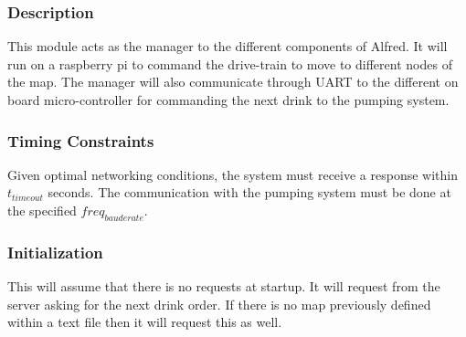 \documentclass [10pt]{article}
\begin{document}

\subsubsection{Description}
This module acts as the manager to the different components of Alfred. It will run on a raspberry pi to command the drive-train to move to different nodes of the map. The manager will also communicate through UART to the different on board micro-controller for commanding the next drink to the pumping system.


\subsubsection{Timing Constraints}
Given optimal networking conditions, the system must receive a response within  $ t_{timeout} $ seconds. The communication with the pumping system must be done at the specified $freq_{bauderate}$.


\subsubsection{Initialization}
This will assume that there is no requests at startup. It will request from the server asking for the next drink order. If there is no map previously defined within a text file then it will request this as well.

\end{document}
